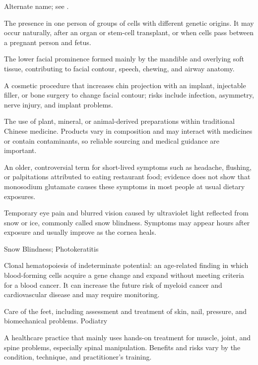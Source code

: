  Alternate name; see .

 The presence in one person of groups of cells with different genetic origins. It may occur naturally, after an organ or stem-cell transplant, or when cells pass between a pregnant person and fetus.

 The lower facial prominence formed mainly by the mandible and overlying soft tissue, contributing to facial contour, speech, chewing, and airway anatomy.

 A cosmetic procedure that increases chin projection with an implant, injectable filler, or bone surgery to change facial contour; risks include infection, asymmetry, nerve injury, and implant problems.

 The use of plant, mineral, or animal-derived preparations within traditional Chinese medicine. Products vary in composition and may interact with medicines or contain contaminants, so reliable sourcing and medical guidance are important.

 An older, controversial term for short-lived symptoms such as headache, flushing, or palpitations attributed to eating restaurant food; evidence does not show that monosodium glutamate causes these symptoms in most people at usual dietary exposures.

 Temporary eye pain and blurred vision caused by ultraviolet light reflected from snow or ice, commonly called snow blindness. Symptoms may appear hours after exposure and usually improve as the cornea heals.

\synonyms
Snow Blindness; Photokeratitis

 Clonal hematopoiesis of indeterminate potential: an age-related finding in which blood-forming cells acquire a gene change and expand without meeting criteria for a blood cancer. It can increase the future risk of myeloid cancer and cardiovascular disease and may require monitoring.

 Care of the feet, including assessment and treatment of skin, nail, pressure, and biomechanical problems.
\synonyms
Podiatry

 A healthcare practice that mainly uses hands-on treatment for muscle, joint, and spine problems, especially spinal manipulation. Benefits and risks vary by the condition, technique, and practitioner's training.

